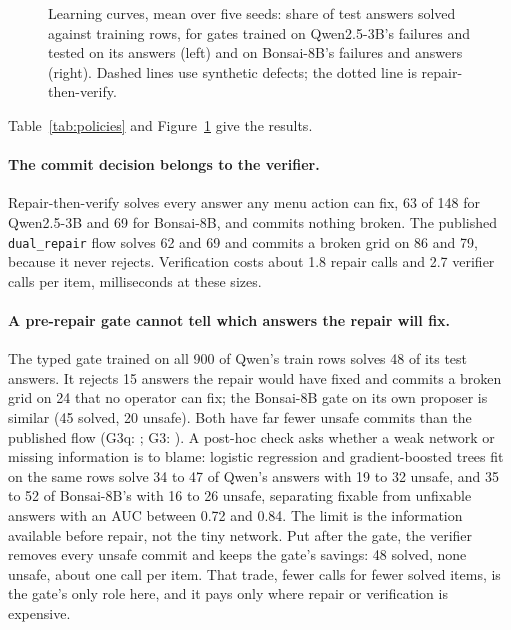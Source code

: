 \documentclass[11pt]{article}
\begin{document}
\begin{table}[t]
  \centering
  \small
  \resizebox{\linewidth}{!}{}
  \caption{Policies scored inside the skill on real test answers from three proposers. Calls are repair-operator plus verifier calls per item. TRM rows are the majority vote of five seeds trained on all rows of their curriculum.}
  \label{tab:policies}
\end{table}

\begin{figure}[t]
  \centering
  \hfill
  
  \caption{Learning curves, mean over five seeds: share of test answers solved against training rows, for gates trained on Qwen2.5-3B's failures and tested on its answers (left) and on Bonsai-8B's failures and answers (right). Dashed lines use synthetic defects; the dotted line is repair-then-verify.}
  \label{fig:curves}
\end{figure}

Table~\ref{tab:policies} and Figure~\ref{fig:curves} give the results.

\paragraph{The commit decision belongs to the verifier.} Repair-then-verify solves every answer any menu action can fix, 63 of 148 for Qwen2.5-3B and 69 for Bonsai-8B, and commits nothing broken. The published \texttt{dual\_repair} flow solves 62 and 69 and commits a broken grid on 86 and 79, because it never rejects. Verification costs about 1.8 repair calls and 2.7 verifier calls per item, milliseconds at these sizes.

\paragraph{A pre-repair gate cannot tell which answers the repair will fix.} The typed gate trained on all 900 of Qwen's train rows solves 48 of its test answers. It rejects 15 answers the repair would have fixed and commits a broken grid on 24 that no operator can fix; the Bonsai-8B gate on its own proposer is similar (45 solved, 20 unsafe). Both have far fewer unsafe commits than the published flow (G3q: \testGthreeq; G3: \testGthree). A post-hoc check asks whether a weak network or missing information is to blame: logistic regression and gradient-boosted trees fit on the same rows solve 34 to 47 of Qwen's answers with 19 to 32 unsafe, and 35 to 52 of Bonsai-8B's with 16 to 26 unsafe, separating fixable from unfixable answers with an AUC between 0.72 and 0.84. The limit is the information available before repair, not the tiny network. Put after the gate, the verifier removes every unsafe commit and keeps the gate's savings: 48 solved, none unsafe, about one call per item. That trade, fewer calls for fewer solved items, is the gate's only role here, and it pays only where repair or verification is expensive.
\end{document}
